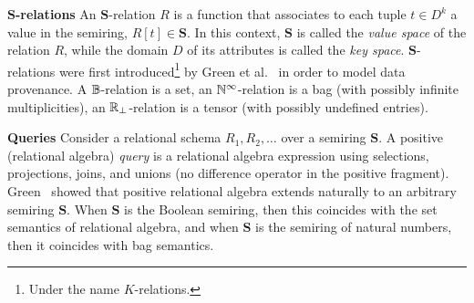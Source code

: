 
{\bf $\bm S$-relations} An $\bm S$-relation $R$ is a function that
associates to each tuple $t \in D^k$ a value in the semiring,
$R[t] \in \bm S$.  In this context, $\bm S$ is called the {\em value
  space} of the relation $R$, while the domain $D$ of its attributes
is called the {\em key space}.  $\bm S$-relations were first
introduced\footnote{Under the name $K$-relations.} by Green et
al.~\cite{DBLP:conf/pods/GreenKT07} in order to model data provenance.
A $\mathbb B$-relation is a set, an $\mathbb N^\infty$-relation is a bag (with
possibly infinite multiplicities), an $\mathbb R_\bot$-relation is a tensor
(with possibly undefined entries).

{\bf Queries} Consider a relational schema $R_1, R_2, \ldots$ over a
semiring $\bm S$.  A positive (relational algebra) {\em
  query} is a relational algebra expression using selections,
projections, joins, and unions (no difference operator in the positive
fragment).    Green~\cite{DBLP:conf/pods/GreenKT07} showed that
positive relational algebra extends naturally to an arbitrary
semi\-ring $\bm S$.  When $\bm S$ is the Boolean semiring, then this
coincides with the set semantics of relational algebra, and when
$\bm S$ is the semiring of natural numbers, then it coincides with bag
semantics.

